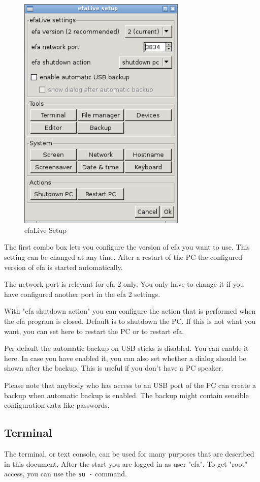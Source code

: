 \documentclass[a4paper,12pt,twoside]{article}
\begin{document}
\begin{figure}
    \centering
    \includegraphics[width=8cm]{efaLiveen-img/efaLiveen-img20.png}
    \caption{efaLive Setup}
    \label{fig:efalivesetup}
\end{figure}

The first combo box lets you configure the version of efa you want to
use. This setting can be changed at any time. After a restart of the PC
the configured version of efa is started automatically.

The network port is relevant for efa 2 only. You only have to change it
if you have configured another port in the efa 2 settings.

With "efa shutdown action" you can configure
the action that is performed when the efa program is closed. Default is
to shutdown the PC. If this is not what you want, you can set here to
restart the PC or to restart efa.

Per default the automatic backup on USB sticks is disabled. You can
enable it here. In case you have enabled it, you can also set whether a
dialog should be shown after the backup. This is useful if you
don't have a PC speaker.

Please note that anybody who has access to an USB port of the PC can
create a backup when automatic backup is enabled. The backup might
contain sensible configuration data like passwords.


\subsection{Terminal}
\label{sct:terminal}
The terminal, or text console, can be used for many purposes that are
described in this document. After the start you are logged in as user
"efa". To get "root" access, you can use the \texttt{su -} command.
\end{document}

